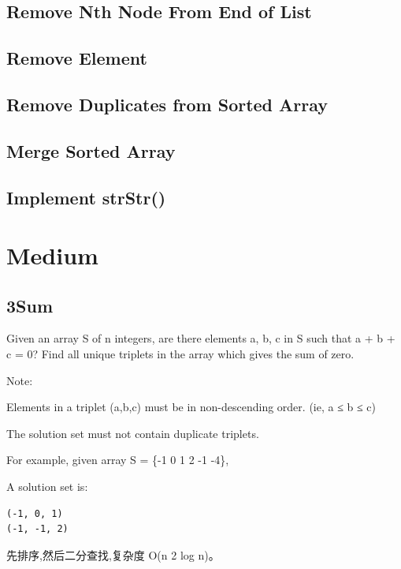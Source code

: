 \documentclass[12pt]{book}
\begin{document}
\subsection{Remove Nth Node From End of List}
\label{sec-15-1-2}
\subsection{Remove Element}
\label{sec-15-1-3}
\subsection{Remove Duplicates from Sorted Array}
\label{sec-15-1-4}
\subsection{Merge Sorted Array}
\label{sec-15-1-5}
\subsection{Implement strStr()}
\label{sec-15-1-6}
\section{Medium}
\label{sec-15-2}
\subsection{3Sum}
\label{sec-15-2-1}
Given an array S of n integers, are there elements a, b, c in S such that a + b + c = 0? Find all unique triplets in the array which gives the sum of zero.

Note:

Elements in a triplet (a,b,c) must be in non-descending order. (ie, a ≤ b ≤ c)

The solution set must not contain duplicate triplets.

For example, given array S = \{-1 0 1 2 -1 -4\},

A solution set is:
\lstset{language=java,label= ,caption= ,numbers=none}
\begin{lstlisting}
(-1, 0, 1)
(-1, -1, 2)
\end{lstlisting}

先排序,然后二分查找,复杂度 O(n 2 log n)。
\end{document}
